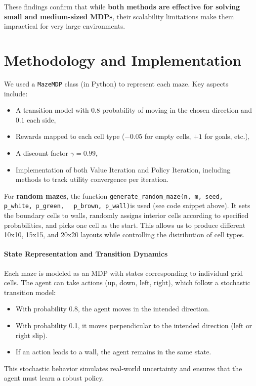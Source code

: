 \documentclass[11pt]{article}
\begin{document}
\noindent These findings confirm that while \textbf{both methods are effective for solving small and medium-sized MDPs}, their scalability limitations make them impractical for very large environments.

\newpage
\section{Methodology and Implementation}
\label{sec:methodology}
We used a \texttt{MazeMDP} class (in Python) to represent each maze. Key aspects include:
\begin{itemize}
    \item A transition model with $0.8$ probability of moving in the chosen direction and $0.1$ each side,
    \item Rewards mapped to each cell type ($-0.05$ for empty cells, $+1$ for goals, etc.),
    \item A discount factor $\gamma = 0.99$,
    \item Implementation of both Value Iteration and Policy Iteration, including methods to track utility convergence per iteration.
\end{itemize}

\noindent For \textbf{random mazes}, the function \verb|generate_random_maze(n, m, seed, p_white, p_green, | \newline  
\verb| p_brown, p_wall)|is used (see code snippet above). It sets the boundary cells to walls, randomly assigns interior cells according to specified probabilities, and picks one cell as the start. This allows us to produce different 10x10, 15x15, and 20x20 layouts while controlling the distribution of cell types.

\paragraph{State Representation and Transition Dynamics} \leavevmode\newline
Each maze is modeled as an MDP with states corresponding to individual grid cells. The agent can take actions (up, down, left, right), which follow a stochastic transition model:
\begin{itemize}
    \item With probability 0.8, the agent moves in the intended direction.
    \item With probability 0.1, it moves perpendicular to the intended direction (left or right slip).
    \item If an action leads to a wall, the agent remains in the same state.
\end{itemize}
This stochastic behavior simulates real-world uncertainty and ensures that the agent must learn a robust policy.
\end{document}
